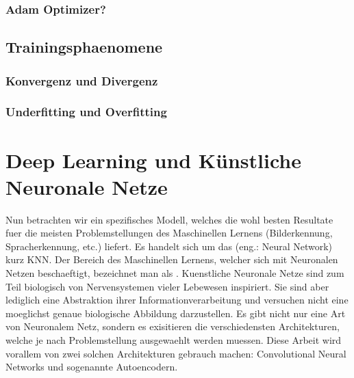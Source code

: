 \cite{Nielsen}

\subsection{Adam Optimizer?}

\section{Trainingsphaenomene}

\subsection{Konvergenz und Divergenz}
\subsection{Underfitting und Overfitting}


\chapter{Deep Learning und Künstliche Neuronale Netze}
Nun betrachten wir ein spezifisches Modell, welches die wohl besten Resultate
fuer die meisten Problemstellungen des Maschinellen Lernens (Bilderkennung,
Spracherkennung, etc.) liefert. Es handelt sich um das  (eng.: Neural Network) kurz KNN.
Der Bereich des Maschinellen Lernens, welcher sich mit Neuronalen Netzen
beschaeftigt, bezeichnet man als .
\para{}
Kuenstliche Neuronale Netze sind zum Teil biologisch von Nervensystemen vieler
Lebewesen inspiriert.
Sie sind aber lediglich eine Abstraktion ihrer Informationverarbeitung und versuchen nicht eine moeglichst genaue biologische Abbildung darzustellen.
Es gibt nicht nur eine Art von Neuronalem Netz, sondern es exisitieren die
verschiedensten Architekturen, welche je nach Problemstellung ausgewaehlt werden
muessen. Diese Arbeit wird vorallem von zwei solchen Architekturen gebrauch machen:
Convolutional Neural Networks und sogenannte Autoencodern.

\para{}
\cite{wiki:kuenstliches_neuronales_netz}

